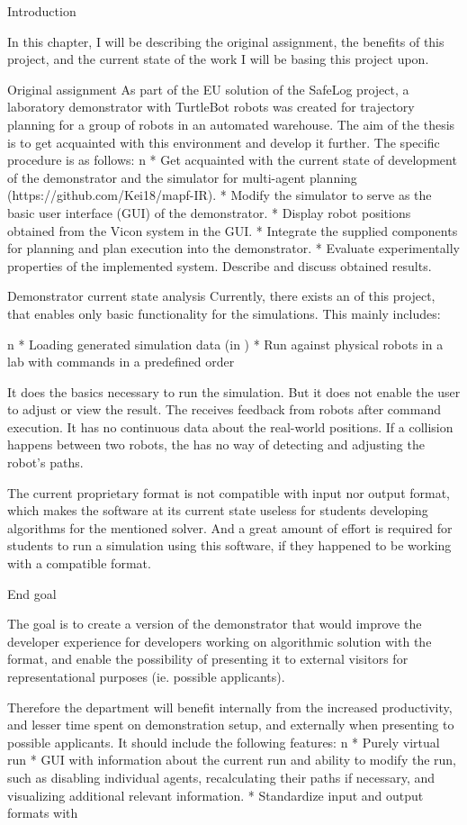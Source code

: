 \chap Introduction

In this chapter, I will be describing the original assignment, the benefits of this project, and the current state of the work I will be basing this project upon.

\sec Original assignment
As part of the EU solution of the SafeLog project, a laboratory demonstrator with TurtleBot robots was created for trajectory planning for a group of robots in an automated warehouse. The aim of the thesis is to get acquainted with this environment and develop it further. The specific procedure is as follows:
\begitems \style n
    * Get acquainted with the current state of development of the demonstrator and the simulator for multi-agent planning (https://github.com/Kei18/mapf-IR).
    * Modify the simulator to serve as the basic user interface (GUI) of the demonstrator.
    * Display robot positions obtained from the Vicon system in the GUI.
    * Integrate the supplied components for planning and plan execution into the demonstrator.
    * Evaluate experimentally properties of the implemented system. Describe and discuss obtained results.
\enditems

\sec Demonstrator current state analysis
Currently, there exists an {\oldRepo} of this project, that enables only basic functionality for the simulations. This mainly includes:

\begitems \style n
    * Loading generated simulation data (in {\oldFormat})
    * Run against physical robots in a lab with commands in a predefined order
\enditems

It does the basics necessary to run the simulation. But it does not enable the user to adjust or view the result. The {\oldRepo} receives feedback from robots after command execution. It has no continuous data about the real-world positions. If a collision happens between two robots, the {\oldRepo} has no way of detecting and adjusting the robot's paths.

The current proprietary format is not compatible with {\mapfIR} input nor output format, which makes the software at its current state useless for students developing algorithms for the mentioned solver. And a great amount of effort is required for students to run a simulation using this software, if they happened to be working with a compatible format.

\sec End goal

The goal is to create a version of the demonstrator that would improve the developer experience for developers working on algorithmic solution with the {\mapfIR} format, and enable the possibility of presenting it to external visitors for representational purposes (ie. possible applicants).

Therefore the department will benefit internally from the increased productivity, and lesser time spent on demonstration setup, and externally when presenting to possible applicants.
It should include the following features:
\begitems \style n
    * Purely virtual run
    * GUI with information about the current run and ability to modify the run, such as disabling individual agents, recalculating their paths if necessary, and visualizing additional relevant information.
    * Standardize input and output formats with \mapfIR
\enditems
